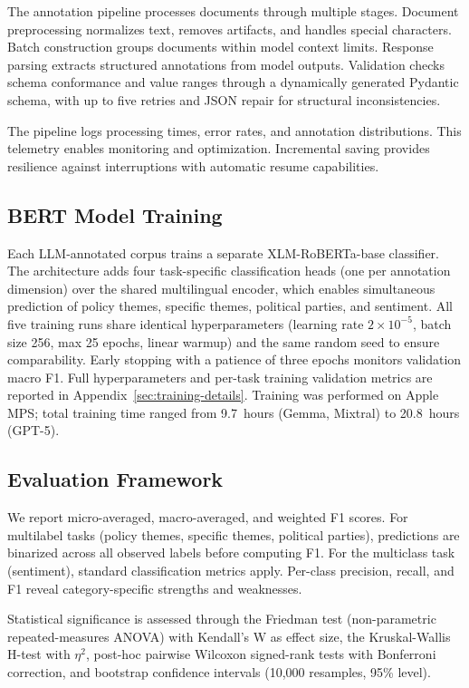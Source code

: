 \documentclass[12pt]{article}
\begin{document}
The annotation pipeline processes documents through multiple stages. Document preprocessing normalizes text, removes artifacts, and handles special characters. Batch construction groups documents within model context limits. Response parsing extracts structured annotations from model outputs. Validation checks schema conformance and value ranges through a dynamically generated Pydantic schema, with up to five retries and JSON repair for structural inconsistencies.

The pipeline logs processing times, error rates, and annotation distributions. This telemetry enables monitoring and optimization. Incremental saving provides resilience against interruptions with automatic resume capabilities.

\subsection{BERT Model Training}

Each LLM-annotated corpus trains a separate XLM-RoBERTa-base classifier. The architecture adds four task-specific classification heads (one per annotation dimension) over the shared multilingual encoder, which enables simultaneous prediction of policy themes, specific themes, political parties, and sentiment. All five training runs share identical hyperparameters (learning rate $2 \times 10^{-5}$, batch size 256, max 25 epochs, linear warmup) and the same random seed to ensure comparability. Early stopping with a patience of three epochs monitors validation macro F1. Full hyperparameters and per-task training validation metrics are reported in Appendix~\ref{sec:training-details}. Training was performed on Apple MPS; total training time ranged from 9.7~hours (Gemma, Mixtral) to 20.8~hours (GPT-5).

\subsection{Evaluation Framework}

We report micro-averaged, macro-averaged, and weighted F1 scores. For multilabel tasks (policy themes, specific themes, political parties), predictions are binarized across all observed labels before computing F1. For the multiclass task (sentiment), standard classification metrics apply. Per-class precision, recall, and F1 reveal category-specific strengths and weaknesses.

Statistical significance is assessed through the Friedman test (non-parametric repeated-measures ANOVA) with Kendall’s W as effect size, the Kruskal-Wallis H-test with $\eta^2$, post-hoc pairwise Wilcoxon signed-rank tests with Bonferroni correction, and bootstrap confidence intervals (10,000 resamples, 95\% level).
\end{document}
